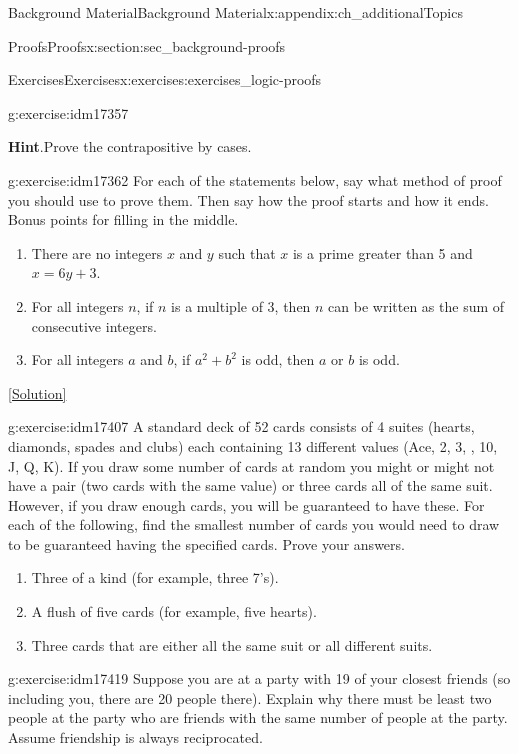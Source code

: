 \documentclass[oneside,10pt,]{book}
\numberwithin{equation}{chapter}
\begin{document}
\begin{appendixptx}{Background Material}{}{Background Material}{}{}{x:appendix:ch_additionalTopics}
\begin{sectionptx}{Proofs}{}{Proofs}{}{}{x:section:sec_background-proofs}
\begin{exercises-subsection}{Exercises}{}{Exercises}{}{}{x:exercises:exercises_logic-proofs}
\begin{divisionexercise}{14}{}{}{g:exercise:idm17357}
\par\smallskip%
\noindent\textbf{Hint}.\hypertarget{g:hint:idm17360}{}\quad{}Prove the contrapositive by cases.%
\end{divisionexercise}%
\begin{divisionexercise}{15}{}{}{g:exercise:idm17362}%
For each of the statements below, say what method of proof you should use to prove them. Then say how the proof starts and how it ends. Bonus points for filling in the middle.%
\par
%
\begin{enumerate}[label=(\alph*)]
\item{}There are no integers \(x\) and \(y\) such that \(x\) is a prime greater than 5 and \(x = 6y + 3\).%
\item{}For all integers \(n\), if \(n\) is a multiple of 3, then \(n\) can be written as the sum of consecutive integers.%
\item{}For all integers \(a\) and \(b\), if \(a^2 + b^2\) is odd, then \(a\) or \(b\) is odd.%
\end{enumerate}
%
\space\hspace*{0pt}\hfill{\tiny\hyperlink{g:solution:idm17385-main}{[Solution]}}\end{divisionexercise}%
\begin{divisionexercise}{16}{}{}{g:exercise:idm17407}%
A standard deck of 52 cards consists of 4 suites (hearts, diamonds, spades and clubs) each containing 13 different values (Ace, 2, 3, \textellipsis{}, 10, J, Q, K). If you draw some number of cards at random you might or might not have a pair (two cards with the same value) or three cards all of the same suit. However, if you draw enough cards, you will be guaranteed to have these. For each of the following, find the smallest number of cards you would need to draw to be guaranteed having the specified cards. Prove your answers.%
\par
%
\begin{enumerate}[label=(\alph*)]
\item{}Three of a kind (for example, three 7's). %
\item{}A flush of five cards (for example, five hearts). %
\item{}Three cards that are either all the same suit or all different suits. %
\end{enumerate}
%
\end{divisionexercise}%
\begin{divisionexercise}{17}{}{}{g:exercise:idm17419}%
Suppose you are at a party with 19 of your closest friends (so including you, there are 20 people there). Explain why there must be least two people at the party who are friends with the same number of people at the party. Assume friendship is always reciprocated.%

\end{divisionexercise}
\end{exercises-subsection}
\end{sectionptx}
\end{appendixptx}
\end{document}
